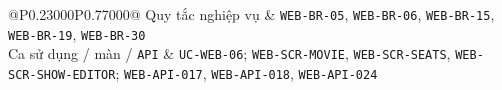 \begin{longtable}{@{}P{0.23000\SRSWidth}P{0.77000\SRSWidth}@{}}
Quy tắc nghiệp vụ & \texttt{WEB-\allowbreak{}BR-\allowbreak{}05}, \texttt{WEB-\allowbreak{}BR-\allowbreak{}06}, \texttt{WEB-\allowbreak{}BR-\allowbreak{}15}, \texttt{WEB-\allowbreak{}BR-\allowbreak{}19}, \texttt{WEB-\allowbreak{}BR-\allowbreak{}30} \\[3pt]
Ca sử dụng /\allowbreak{} màn /\allowbreak{} \texttt{API} & \texttt{UC-\allowbreak{}WEB-\allowbreak{}06}; \texttt{WEB-\allowbreak{}SCR-\allowbreak{}MOVIE}, \texttt{WEB-\allowbreak{}SCR-\allowbreak{}SEATS}, \texttt{WEB-\allowbreak{}SCR-\allowbreak{}SHOW-\allowbreak{}EDITOR}; \texttt{WEB-\allowbreak{}API-\allowbreak{}017}, \texttt{WEB-\allowbreak{}API-\allowbreak{}018}, \texttt{WEB-\allowbreak{}API-\allowbreak{}024} \\[3pt]
\end{longtable}
\endgroup

